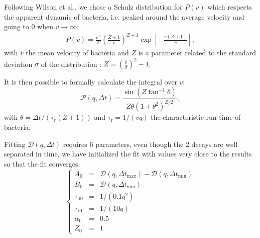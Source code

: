 \documentclass[%
 aip,
 jmp,%
 amsmath,amssymb,
reprint,%
]{revtex4-1}
\begin{document}
Following Wilson et al.\cite{1_BactMobil}, we chose a Schulz distribution for $P(v)$ which respects the apparent dynamic of bacteria, i.e. peaked around the average velocity and going to 0 when $v \rightarrow \infty$:
\begin{multline}
P(v) = \frac{v^Z}{Z!} \left(\frac{Z+1}{\overline{v}}\right)^{Z+1} \exp\left[-\frac{v(Z+1)}{\overline{v}}\right],
\end{multline}
with $\overline{v}$ the mean velocity of bacteria and $Z$ is a parameter related to the standard deviation $\sigma$ of the distribution : $Z = \left( \frac{\overline{v}}{\sigma} \right)^2 -1$.

It is then possible to formally calculate the integral over $v$:
\begin{equation}
\mathcal{P}(q, \Delta t) = \frac{\sin\left(Z\tan^{-1}\theta\right)}{Z\theta\left(1+\theta^2\right)^{Z/2}},
\end{equation}
with $\theta = \Delta t/\left(\tau_r(Z+1)\right)$ and $\tau_\text{r} = 1/(\overline{v}q)$ the characteristic run time of bacteria.

Fitting $\mathcal{D}(q, \Delta t)$ requires 6 parameters, even though the 2 decays are well separated in time, we have initialized the fit with values very close to the results so that the fit converges:
\begin{equation}
\left\{
\begin{array}{rcl}
A_0 &=& \mathcal{D} (q,\Delta t_\text{max}) - \mathcal{D} (q,\Delta t_\text{min}) \\
B_0 &=& \mathcal{D} (q,\Delta t_\text{min}) \\
\tau_\text{d0} &=& 1/(0.1 q^{2})\\
\tau_\text{r0} &=& 1/(10 q)\\
\alpha_0 &=& 0.5\\
Z_0 &=& 1
\end{array}
\right.
\end{equation}
\end{document}
